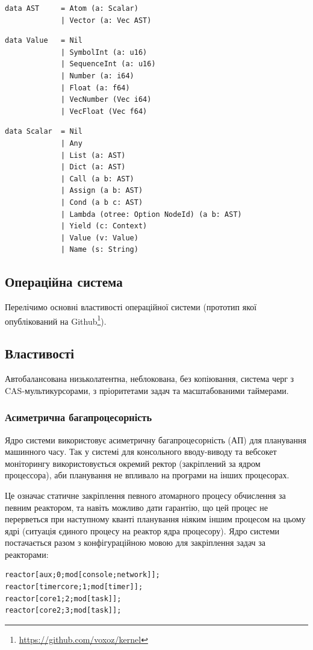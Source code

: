 \begin{lstlisting}
data AST     = Atom (a: Scalar)
             | Vector (a: Vec AST)
\end{lstlisting}

\begin{lstlisting}
data Value   = Nil
             | SymbolInt (a: u16)
             | SequenceInt (a: u16)
             | Number (a: i64)
             | Float (a: f64)
             | VecNumber (Vec i64)
             | VecFloat (Vec f64)
\end{lstlisting}

\begin{lstlisting}
data Scalar  = Nil
             | Any
             | List (a: AST)
             | Dict (a: AST)
             | Call (a b: AST)
             | Assign (a b: AST)
             | Cond (a b c: AST)
             | Lambda (otree: Option NodeId) (a b: AST)
             | Yield (c: Context)
             | Value (v: Value)
             | Name (s: String)
\end{lstlisting}

\subsection{Операційна система}
Перелічимо основні властивості операційної системи (прототип
якої опублікований на Github\footnote{\url{https://github.com/voxoz/kernel}}).

\subsection{Властивості}
Автобалансована низьколатентна, неблокована, без копіювання, система черг
з CAS-мультикурсорами, з пріоритетами задач та масштабованими таймерами.

\subsubsection{Асиметрична багапроцесорність}
Ядро системи використовує асиметричну багапроцесорність (АП)
для планування машинного часу. Так у системі для консольного
вводу-виводу та вебсокет моніторингу використовується окремий
ректор (закріплений за ядром процессора),
аби планування не впливало на програми на інших процесорах.

Це означає статичне закріплення певного атомарного процесу
обчислення за певним реактором, та навіть можливо дати гарантію, що
цей процес не перерветься при наступному кванті планування
ніяким іншим процесом на цьому ядрі (ситуація єдиного процесу
на реактор ядра процесору). Ядро системи постачається разом з конфігураційною
мовою для закріплення задач за реакторами:
\begin{lstlisting}
reactor[aux;0;mod[console;network]];
reactor[timercore;1;mod[timer]];
reactor[core1;2;mod[task]];
reactor[core2;3;mod[task]];
\end{lstlisting}


